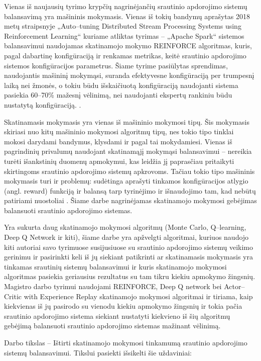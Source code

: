 \documentclass{VUMIFPSbakalaurinis}
\begin{document}
Vienas iš naujausių tyrimo krypčių nagrinėjančių srautinio apdorojimo sistemų balansavimą yra mašininis mokymasis. Vienas iš tokių bandymų aprašytas 2018 metų straipsnyje „Auto–tuning Distributed Stream Processing Systems using Reinforcement Learning“\cite{vaquero2018autotuning} kuriame atliktas tyrimas – „Apache Spark“ sistemos balansavimui naudojamas skatinamojo mokymo REINFORCE algoritmas, kuris, pagal dabartinę konfigūraciją ir renkamas metrikas, keitė srautinio apdorojimo sistemos konfigūracijos parametrus. Šiame tyrime pasiūlytas sprendimas, naudojantis mašininį mokymąsi, suranda efektyvesne konfigūraciją per trumpesnį laiką nei žmonės, o tokiu būdu išskaičiuotą konfigūraciją naudojanti sistema pasiekia 60–70\% mažesnį vėlinimą, nei naudojanti ekspertų rankiniu būdu nustatytą konfigūraciją. \cite{vaquero2018autotuning}. 

Skatinamasis mokymasis yra vienas iš mašininio mokymosi tipų. Šis mokymasis skiriasi nuo kitų mašininio mokymosi algoritmų tipų, nes tokio tipo tinklai mokosi darydami bandymus, klysdami ir pagal tai mokydamiesi. Vienas iš pagrindinių privalumų naudojant skatinamąjį mokymąsi balansavimui – nereikia turėti išankstinių duomenų apmokymui, kas leidžia jį paprasčiau pritaikyti skirtingoms srautinio apdorojimo sistemų apkrovoms. Tačiau tokio tipo mašininis mokymasis turi ir problemų: sudėtinga aprašyti tinkamos konfigūracijos atlygio (angl. reward) funkciją ir balansą tarp tyrinėjimo ir išnaudojimo tam, kad nebūtų patiriami nuostoliai \cite{selfRegulatingStreaming}. Šiame darbe nagrinėjamas skatinamojo mokymosi gebėjimas balansuoti srautinio apdorojimo sistemas.

Yra sukurta daug skatinamojo mokymosi algoritmų (Monte Carlo, Q–learning, Deep Q Network ir kiti), šiame darbe yra apžvelgti algoritmai, kuriuos naudojo kiti autoriai savo tyrimuose susijusiuose su srautinio apdorojimo sistemų veikimo gerinimu ir pasirinkti keli iš jų siekiant patikrinti ar skatinamasis mokymasis yra tinkamas srautinių sistemų balansavimui ir kuris skatinamojo mokymosi algoritmas pasiekia geriausius rezultatus su tam tikru kiekiu apmokymo žingsnių. Magistro darbo tyrimui naudojami REINFORCE, Deep Q network bei Actor–Critic with Experience Replay skatinamojo mokymosi algoritmai ir tiriama, kaip kiekvienas iš jų pasirodo su vienodu kiekiu apmokymo žingsnių ir tokia pačia srautinio apdorojimo sistema siekiant nustatyti kiekvieno iš šių algoritmų gebėjimą balansuoti srautinio apdorojimo sistemas mažinant vėlinimą.

Darbo tikslas – Ištirti skatinamojo mokymosi tinkamumą srautinio apdorojimo sistemų \mbox{balansavimui.}
\newpage
Tikslui pasiekti išsikelti šie uždaviniai:
\end{document}

